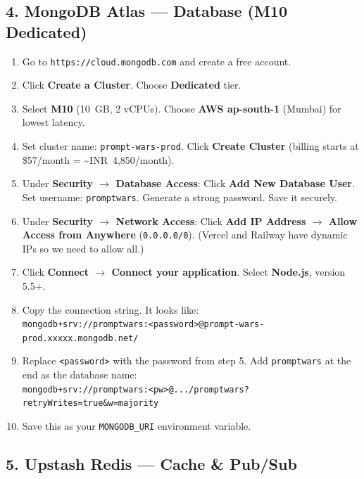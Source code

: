 \documentclass[11pt, a4paper]{article}
\begin{document}
\subsection{4. MongoDB Atlas --- Database (M10 Dedicated)}

\begin{tcolorbox}[stepbox, title={Step-by-Step: MongoDB Atlas M10 Setup}]
\begin{enumerate}[leftmargin=1cm, itemsep=3pt]
    \item Go to \texttt{https://cloud.mongodb.com} and create a free account.
    \item Click \textbf{Create a Cluster}. Choose \textbf{Dedicated} tier.
    \item Select \textbf{M10} (10~GB, 2 vCPUs). Choose \textbf{AWS ap-south-1} (Mumbai) for lowest latency.
    \item Set cluster name: \texttt{prompt-wars-prod}. Click \textbf{Create Cluster} (billing starts at \$57/month = \textasciitilde INR~4,850/month).
    \item Under \textbf{Security $\to$ Database Access}: Click \textbf{Add New Database User}. Set username: \texttt{promptwars}. Generate a strong password. Save it securely.
    \item Under \textbf{Security $\to$ Network Access}: Click \textbf{Add IP Address $\to$ Allow Access from Anywhere} (\texttt{0.0.0.0/0}). (Vercel and Railway have dynamic IPs so we need to allow all.)
    \item Click \textbf{Connect $\to$ Connect your application}. Select \textbf{Node.js}, version 5.5+.
    \item Copy the connection string. It looks like:\\
          \texttt{mongodb+srv://promptwars:<password>@prompt-wars-prod.xxxxx.mongodb.net/}
    \item Replace \texttt{<password>} with the password from step 5. Add \texttt{promptwars} at the end as the database name:\\
          \texttt{mongodb+srv://promptwars:<pw>@.../promptwars?retryWrites=true\&w=majority}
    \item Save this as your \texttt{MONGODB\_URI} environment variable.
\end{enumerate}
\end{tcolorbox}

\subsection{5. Upstash Redis --- Cache \& Pub/Sub}
\end{document}
